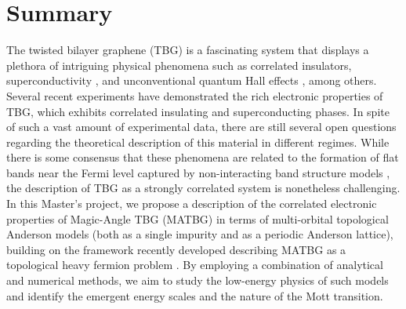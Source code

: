 \documentclass[12pt]{report}
\begin{document}
%
%
\geraTitulo
%
\folhaDeRosto
%
%
%
\tableofcontents
\thispagestyle{empty}
\clearpage
%

\sectionfont{\scshape}



\chapter{Summary} \label{chp:abstract}

The twisted bilayer graphene (TBG) is a fascinating system that displays a plethora of intriguing physical phenomena such as correlated insulators, superconductivity \cite{cao2018}, and unconventional quantum Hall effects \cite{unconv_QHE_tbg_2006}, among others. Several recent experiments have demonstrated the rich electronic properties of TBG, which exhibits correlated insulating and superconducting phases. In spite of such a vast amount of experimental data, there are still several open questions regarding the theoretical description of this material in different regimes. While there is some consensus that these phenomena are related to the formation of flat bands near the Fermi level captured by non-interacting band structure models \cite{macdonald2011}, the description of TBG as a strongly correlated system is nonetheless challenging. In this Master's project, we propose a description of the correlated electronic properties of Magic-Angle TBG (MATBG) in terms of multi-orbital topological Anderson models (both as a single impurity and as a periodic Anderson lattice), building on the framework recently developed describing MATBG as a topological heavy fermion problem \cite{topoheavyfermion2022}. By employing a combination of analytical and numerical methods, we aim to study the low-energy physics of such models and identify the emergent energy scales and the nature of the Mott transition.
\end{document}
